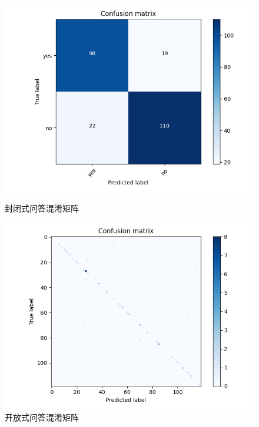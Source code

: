 \begin{figure}[htbp]
	\begin{minipage}{0.5\linewidth}
		\centering	
		\includegraphics[width=1.1\textwidth]{Fig/myfig/chapter3/close_confusionmatrix.png}  %
		\caption{\label{close_confusionmatrix}封闭式问答混淆矩阵} 	
	\end{minipage}
	\begin{minipage}{0.5\linewidth}
		\centering	
		\includegraphics[width=1.1\textwidth]{Fig/myfig/chapter3/open_confusionmatrix.png}  %
		\caption{\label{open_confusionmatrix}开放式问答混淆矩阵} 	
	\end{minipage}	
\end{figure}

